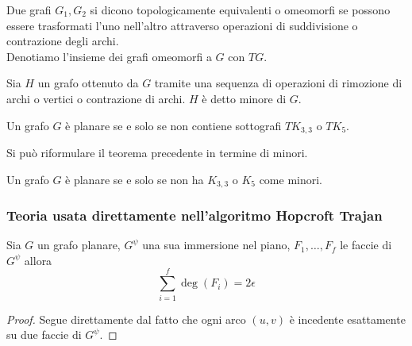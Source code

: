 \begin{definizione}
    Due grafi \(G_1,G_2\) si dicono topologicamente equivalenti o omeomorfi se possono essere trasformati l'uno nell'altro attraverso operazioni di suddivisione o contrazione degli archi.
    \\ Denotiamo l'insieme dei grafi omeomorfi a \(G\) con \(TG\).
\end{definizione}

\begin{definizione}[Minore]
    Sia \(H\) un grafo ottenuto da \(G\) tramite una sequenza di operazioni di rimozione di archi o vertici o contrazione di archi. \(H\) è detto minore di \(G\).
\end{definizione}

\begin{teorema}
    Un grafo \(G\) è planare se e solo se non contiene sottografi \(TK_{3,3}\) o \(TK_5\).
\end{teorema}
\noindent Si può riformulare il teorema precedente in termine di minori.
\begin{teorema}
    Un grafo \(G\) è planare se e solo se non ha \(K_{3,3}\) o \(K_5\) come minori.
\end{teorema}

\subsubsection{Teoria usata direttamente nell'algoritmo Hopcroft Trajan}

\begin{lemma}
    Sia \(G\) un grafo planare, \(G^\psi\) una sua immersione nel piano, \(F_1, \dots, F_f\) le faccie di \(G^\psi\) allora
    \begin{equation} \label{gradifaccie}
        \sum_{i=1}^f \deg(F_i) = 2\epsilon
    \end{equation}
\end{lemma}
\begin{proof}
    Segue direttamente dal fatto che ogni arco \((u,v)\) è incedente esattamente su due faccie di \(G^\psi\).
\end{proof}

